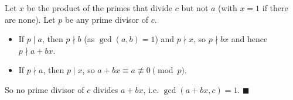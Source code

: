 Let $x$ be the product of the primes that divide $c$ but not $a$ (with $x=1$ if there are none). Let $p$ be any prime divisor of $c$.
\begin{itemize}
\item If $p\mid a$, then $p\nmid b$ (as $\gcd(a,b)=1$) and $p\nmid x$, so $p\nmid bx$ and hence $p\nmid a+bx$.
\item If $p\nmid a$, then $p\mid x$, so $a+bx\equiv a\not\equiv0\pmod p$.
\end{itemize}
So no prime divisor of $c$ divides $a+bx$, i.e. $\gcd(a+bx,c)=1$. $\blacksquare$
